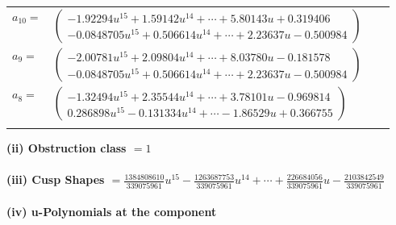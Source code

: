 \documentclass[1p]{elsarticle_modified}
\theoremstyle{definition}
\begin{document}
\begin{tabular}{m{7pt} m{180pt} m{7pt} m{180pt} }
\flushright $a_{10}=$&$\begin{pmatrix}-1.92294 u^{15}+1.59142 u^{14}+\cdots+5.80143 u+0.319406\\-0.0848705 u^{15}+0.506614 u^{14}+\cdots+2.23637 u-0.500984\end{pmatrix}$ \\
\flushright $a_{9}=$&$\begin{pmatrix}-2.00781 u^{15}+2.09804 u^{14}+\cdots+8.03780 u-0.181578\\-0.0848705 u^{15}+0.506614 u^{14}+\cdots+2.23637 u-0.500984\end{pmatrix}$ \\
\flushright $a_{8}=$&$\begin{pmatrix}-1.32494 u^{15}+2.35544 u^{14}+\cdots+3.78101 u-0.969814\\0.286898 u^{15}-0.131334 u^{14}+\cdots-1.86529 u+0.366755\end{pmatrix}$\\&\end{tabular}
\flushleft \textbf{(ii) Obstruction class $= 1$}\\~\\
\flushleft \textbf{(iii) Cusp Shapes $= \frac{1384808610}{339075961} u^{15}-\frac{1263687753}{339075961} u^{14}+\cdots+\frac{226684056}{339075961} u-\frac{2103842549}{339075961}$}\\~\\
\newpage\renewcommand{\arraystretch}{1}
\flushleft \textbf{(iv) u-Polynomials at the component}\newline \\
\end{document}
